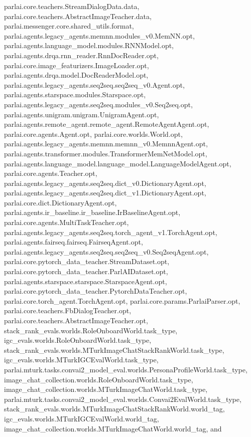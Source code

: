 parlai.\+core.\+teachers.\+Stream\+Dialog\+Data.\+data, parlai.\+core.\+teachers.\+Abstract\+Image\+Teacher.\+data, parlai.\+messenger.\+core.\+shared\+\_\+utils.\+format, parlai.\+agents.\+legacy\+\_\+agents.\+memnn.\+modules\+\_\+v0.\+Mem\+N\+N.\+opt, parlai.\+agents.\+language\+\_\+model.\+modules.\+R\+N\+N\+Model.\+opt, parlai.\+agents.\+drqa.\+rnn\+\_\+reader.\+Rnn\+Doc\+Reader.\+opt, parlai.\+core.\+image\+\_\+featurizers.\+Image\+Loader.\+opt, parlai.\+agents.\+drqa.\+model.\+Doc\+Reader\+Model.\+opt, parlai.\+agents.\+legacy\+\_\+agents.\+seq2seq.\+seq2seq\+\_\+v0.\+Agent.\+opt, parlai.\+agents.\+starspace.\+modules.\+Starspace.\+opt, parlai.\+agents.\+legacy\+\_\+agents.\+seq2seq.\+modules\+\_\+v0.\+Seq2seq.\+opt, parlai.\+agents.\+unigram.\+unigram.\+Unigram\+Agent.\+opt, parlai.\+agents.\+remote\+\_\+agent.\+remote\+\_\+agent.\+Remote\+Agent\+Agent.\+opt, parlai.\+core.\+agents.\+Agent.\+opt, parlai.\+core.\+worlds.\+World.\+opt, parlai.\+agents.\+legacy\+\_\+agents.\+memnn.\+memnn\+\_\+v0.\+Memnn\+Agent.\+opt, parlai.\+agents.\+transformer.\+modules.\+Transformer\+Mem\+Net\+Model.\+opt, parlai.\+agents.\+language\+\_\+model.\+language\+\_\+model.\+Language\+Model\+Agent.\+opt, parlai.\+core.\+agents.\+Teacher.\+opt, parlai.\+agents.\+legacy\+\_\+agents.\+seq2seq.\+dict\+\_\+v0.\+Dictionary\+Agent.\+opt, parlai.\+agents.\+legacy\+\_\+agents.\+seq2seq.\+dict\+\_\+v1.\+Dictionary\+Agent.\+opt, parlai.\+core.\+dict.\+Dictionary\+Agent.\+opt, parlai.\+agents.\+ir\+\_\+baseline.\+ir\+\_\+baseline.\+Ir\+Baseline\+Agent.\+opt, parlai.\+core.\+agents.\+Multi\+Task\+Teacher.\+opt, parlai.\+agents.\+legacy\+\_\+agents.\+seq2seq.\+torch\+\_\+agent\+\_\+v1.\+Torch\+Agent.\+opt, parlai.\+agents.\+fairseq.\+fairseq.\+Fairseq\+Agent.\+opt, parlai.\+agents.\+legacy\+\_\+agents.\+seq2seq.\+seq2seq\+\_\+v0.\+Seq2seq\+Agent.\+opt, parlai.\+core.\+pytorch\+\_\+data\+\_\+teacher.\+Stream\+Dataset.\+opt, parlai.\+core.\+pytorch\+\_\+data\+\_\+teacher.\+Parl\+A\+I\+Dataset.\+opt, parlai.\+agents.\+starspace.\+starspace.\+Starspace\+Agent.\+opt, parlai.\+core.\+pytorch\+\_\+data\+\_\+teacher.\+Pytorch\+Data\+Teacher.\+opt, parlai.\+core.\+torch\+\_\+agent.\+Torch\+Agent.\+opt, parlai.\+core.\+params.\+Parlai\+Parser.\+opt, parlai.\+core.\+teachers.\+Fb\+Dialog\+Teacher.\+opt, parlai.\+core.\+teachers.\+Abstract\+Image\+Teacher.\+opt, stack\+\_\+rank\+\_\+evals.\+worlds.\+Role\+Onboard\+World.\+task\+\_\+type, igc\+\_\+evals.\+worlds.\+Role\+Onboard\+World.\+task\+\_\+type, stack\+\_\+rank\+\_\+evals.\+worlds.\+M\+Turk\+Image\+Chat\+Stack\+Rank\+World.\+task\+\_\+type, igc\+\_\+evals.\+worlds.\+M\+Turk\+I\+G\+C\+Eval\+World.\+task\+\_\+type, parlai.\+mturk.\+tasks.\+convai2\+\_\+model\+\_\+eval.\+worlds.\+Persona\+Profile\+World.\+task\+\_\+type, image\+\_\+chat\+\_\+collection.\+worlds.\+Role\+Onboard\+World.\+task\+\_\+type, image\+\_\+chat\+\_\+collection.\+worlds.\+M\+Turk\+Image\+Chat\+World.\+task\+\_\+type, parlai.\+mturk.\+tasks.\+convai2\+\_\+model\+\_\+eval.\+worlds.\+Convai2\+Eval\+World.\+task\+\_\+type, stack\+\_\+rank\+\_\+evals.\+worlds.\+M\+Turk\+Image\+Chat\+Stack\+Rank\+World.\+world\+\_\+tag, igc\+\_\+evals.\+worlds.\+M\+Turk\+I\+G\+C\+Eval\+World.\+world\+\_\+tag, image\+\_\+chat\+\_\+collection.\+worlds.\+M\+Turk\+Image\+Chat\+World.\+world\+\_\+tag, and 